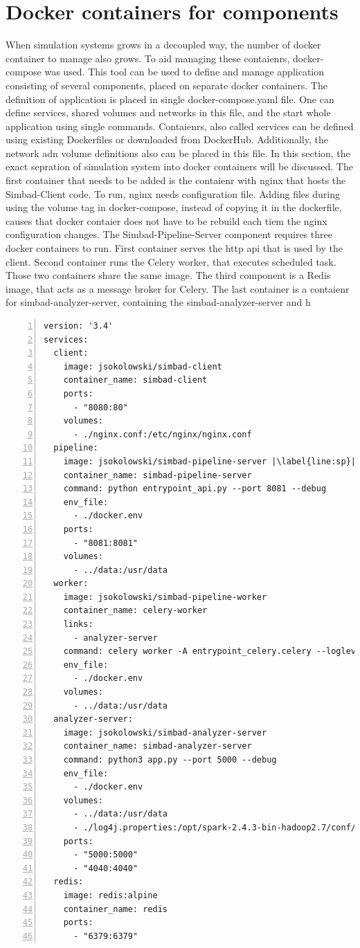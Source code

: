 \section{Docker containers for components}
When simulation systems grows in a decoupled way, the number of docker container to manage also grows. To aid managing these contaienrs, docker-compose was used. This tool can be used to define and manage application consisting of several components, placed on separate docker containers. The definition of application is placed in single docker-compose.yaml file. One can define services, shared volumes and networks in this file, and the start whole application using single commands. Contaienrs, also called services can be defined using existing Dockerfiles or downloaded from DockerHub. Additionally, the network adn volume definitions also can be placed in this file. In this section, the exact sepration of simulation system into docker containers will be discussed. 
The first container that needs to be added is the contaienr with nginx that hosts the Simbad-Client code. To run, nginx needs configuration file. Adding files during using the volume tag in docker-compose, instead of copying it in the dockerfile, causes that docker contaier does not have to be rebuild each tiem the nginx configuration changes.
The Simbad-Pipeline-Server component requires three docker containers to run. First container serves the http api that is used by the client. Second container runs the Celery worker, that executes scheduled task. Those two containers share the same image. The third component is a Redis image, that acts as a message broker for Celery. The last container is a contaienr for simbad-analyzer-server, containing the simbad-analyzer-server and h
\newpage
\begin{lstlisting}[label=list:sp-exec-local-use,caption=Use of LocalExecutor for SimBaD-CLI step, basicstyle=\footnotesize\ttfamily, numbers=left, escapechar=|]
version: '3.4'
services:
  client:
    image: jsokolowski/simbad-client
    container_name: simbad-client
    ports:
      - "8080:80"
    volumes:
      - ./nginx.conf:/etc/nginx/nginx.conf
  pipeline:
    image: jsokolowski/simbad-pipeline-server |\label{line:sp}|
    container_name: simbad-pipeline-server
    command: python entrypoint_api.py --port 8081 --debug
    env_file:
      - ./docker.env
    ports:
      - "8081:8081"
    volumes:
      - ../data:/usr/data
  worker:
    image: jsokolowski/simbad-pipeline-worker
    container_name: celery-worker
    links:
      - analyzer-server
    command: celery worker -A entrypoint_celery.celery --loglevel=info
    env_file:
      - ./docker.env
    volumes:
      - ../data:/usr/data
  analyzer-server:
    image: jsokolowski/simbad-analyzer-server
    container_name: simbad-analyzer-server
    command: python3 app.py --port 5000 --debug
    env_file:
      - ./docker.env
    volumes:
      - ../data:/usr/data
      - ./log4j.properties:/opt/spark-2.4.3-bin-hadoop2.7/conf/log4j.properties
    ports:
      - "5000:5000"
      - "4040:4040"
  redis:
    image: redis:alpine
    container_name: redis
    ports:
      - "6379:6379"
\end{lstlisting}
